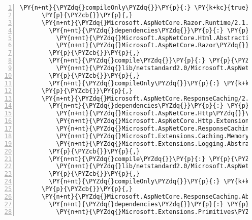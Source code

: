 \begin{Verbatim}[commandchars=\\\{\},numbers=left,firstnumber=1,stepnumber=1,numberblanklines=0]
        \PY{n+nt}{\PYZdq{}compileOnly\PYZdq{}}\PY{p}{:} \PY{k+kc}{true}
      \PY{p}{\PYZcb{}}\PY{p}{,}
      \PY{n+nt}{\PYZdq{}Microsoft.AspNetCore.Razor.Runtime/2.1.0\PYZhy{}rc1\PYZhy{}final\PYZdq{}}\PY{p}{:} \PY{p}{\PYZob{}}
        \PY{n+nt}{\PYZdq{}dependencies\PYZdq{}}\PY{p}{:} \PY{p}{\PYZob{}}
          \PY{n+nt}{\PYZdq{}Microsoft.AspNetCore.Html.Abstractions\PYZdq{}}\PY{p}{:} \PY{l+s+s2}{\PYZdq{}2.1.0\PYZhy{}rc1\PYZhy{}final\PYZdq{}}\PY{p}{,}
          \PY{n+nt}{\PYZdq{}Microsoft.AspNetCore.Razor\PYZdq{}}\PY{p}{:} \PY{l+s+s2}{\PYZdq{}2.1.0\PYZhy{}rc1\PYZhy{}final\PYZdq{}}
        \PY{p}{\PYZcb{}}\PY{p}{,}
        \PY{n+nt}{\PYZdq{}compile\PYZdq{}}\PY{p}{:} \PY{p}{\PYZob{}}
          \PY{n+nt}{\PYZdq{}lib/netstandard2.0/Microsoft.AspNetCore.Razor.Runtime.dll\PYZdq{}}\PY{p}{:} \PY{p}{\PYZob{}}\PY{p}{\PYZcb{}}
        \PY{p}{\PYZcb{}}\PY{p}{,}
        \PY{n+nt}{\PYZdq{}compileOnly\PYZdq{}}\PY{p}{:} \PY{k+kc}{true}
      \PY{p}{\PYZcb{}}\PY{p}{,}
      \PY{n+nt}{\PYZdq{}Microsoft.AspNetCore.ResponseCaching/2.1.0\PYZhy{}rc1\PYZhy{}final\PYZdq{}}\PY{p}{:} \PY{p}{\PYZob{}}
        \PY{n+nt}{\PYZdq{}dependencies\PYZdq{}}\PY{p}{:} \PY{p}{\PYZob{}}
          \PY{n+nt}{\PYZdq{}Microsoft.AspNetCore.Http\PYZdq{}}\PY{p}{:} \PY{l+s+s2}{\PYZdq{}2.1.0\PYZhy{}rc1\PYZhy{}final\PYZdq{}}\PY{p}{,}
          \PY{n+nt}{\PYZdq{}Microsoft.AspNetCore.Http.Extensions\PYZdq{}}\PY{p}{:} \PY{l+s+s2}{\PYZdq{}2.1.0\PYZhy{}rc1\PYZhy{}final\PYZdq{}}\PY{p}{,}
          \PY{n+nt}{\PYZdq{}Microsoft.AspNetCore.ResponseCaching.Abstractions\PYZdq{}}\PY{p}{:} \PY{l+s+s2}{\PYZdq{}2.1.0\PYZhy{}rc1\PYZhy{}final\PYZdq{}}\PY{p}{,}
          \PY{n+nt}{\PYZdq{}Microsoft.Extensions.Caching.Memory\PYZdq{}}\PY{p}{:} \PY{l+s+s2}{\PYZdq{}2.1.0\PYZhy{}rc1\PYZhy{}final\PYZdq{}}\PY{p}{,}
          \PY{n+nt}{\PYZdq{}Microsoft.Extensions.Logging.Abstractions\PYZdq{}}\PY{p}{:} \PY{l+s+s2}{\PYZdq{}2.1.0\PYZhy{}rc1\PYZhy{}final\PYZdq{}}
        \PY{p}{\PYZcb{}}\PY{p}{,}
        \PY{n+nt}{\PYZdq{}compile\PYZdq{}}\PY{p}{:} \PY{p}{\PYZob{}}
          \PY{n+nt}{\PYZdq{}lib/netstandard2.0/Microsoft.AspNetCore.ResponseCaching.dll\PYZdq{}}\PY{p}{:} \PY{p}{\PYZob{}}\PY{p}{\PYZcb{}}
        \PY{p}{\PYZcb{}}\PY{p}{,}
        \PY{n+nt}{\PYZdq{}compileOnly\PYZdq{}}\PY{p}{:} \PY{k+kc}{true}
      \PY{p}{\PYZcb{}}\PY{p}{,}
      \PY{n+nt}{\PYZdq{}Microsoft.AspNetCore.ResponseCaching.Abstractions/2.1.0\PYZhy{}rc1\PYZhy{}final\PYZdq{}}\PY{p}{:} \PY{p}{\PYZob{}}
        \PY{n+nt}{\PYZdq{}dependencies\PYZdq{}}\PY{p}{:} \PY{p}{\PYZob{}}
          \PY{n+nt}{\PYZdq{}Microsoft.Extensions.Primitives\PYZdq{}}\PY{p}{:} \PY{l+s+s2}{\PYZdq{}2.1.0\PYZhy{}rc1\PYZhy{}final\PYZdq{}}

\end{Verbatim}
